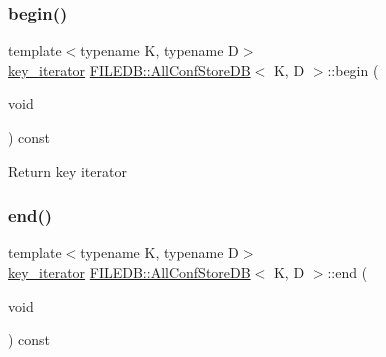 \subsubsection{\texorpdfstring{begin()}{begin()}\hspace{0.1cm}{\footnotesize\ttfamily [3/3]}}
{\footnotesize\ttfamily template$<$typename K, typename D$>$ \\
\mbox{\hyperlink{classFILEDB_1_1AllConfStoreDB_a2ce8981ca7049ed0c2c6e438873a9c1b}{key\+\_\+iterator}} \mbox{\hyperlink{classFILEDB_1_1AllConfStoreDB}{F\+I\+L\+E\+D\+B\+::\+All\+Conf\+Store\+DB}}$<$ K, D $>$\+::begin (\begin{DoxyParamCaption}\item[{void}]{ }\end{DoxyParamCaption}) const\hspace{0.3cm}{\ttfamily [inline]}}

Return key iterator \mbox{\label{classFILEDB_1_1AllConfStoreDB_a213c914b326e7769411e305ceb375b1d}} 
\subsubsection{\texorpdfstring{end()}{end()}\hspace{0.1cm}{\footnotesize\ttfamily [1/3]}}
{\footnotesize\ttfamily template$<$typename K, typename D$>$ \\
\mbox{\hyperlink{classFILEDB_1_1AllConfStoreDB_a2ce8981ca7049ed0c2c6e438873a9c1b}{key\+\_\+iterator}} \mbox{\hyperlink{classFILEDB_1_1AllConfStoreDB}{F\+I\+L\+E\+D\+B\+::\+All\+Conf\+Store\+DB}}$<$ K, D $>$\+::end (\begin{DoxyParamCaption}\item[{void}]{ }\end{DoxyParamCaption}) const\hspace{0.3cm}{\ttfamily [inline]}}

\mbox{\label{classFILEDB_1_1AllConfStoreDB_a213c914b326e7769411e305ceb375b1d}} 
